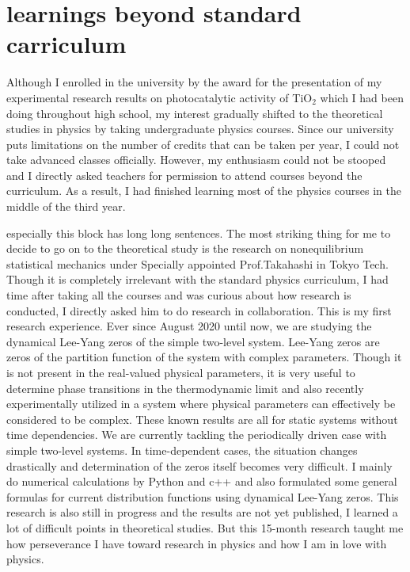 \documentclass[a4]{article}
\begin{document}
\section{learnings beyond standard carriculum}
Although I enrolled in the university by the award for the presentation of my experimental research results on photocatalytic activity of TiO$_2$ which I had been doing throughout high school, my interest gradually shifted to the theoretical studies in physics by taking undergraduate physics courses. Since our university puts limitations on the number of credits that can be taken per year, I could not take advanced classes officially. However, my enthusiasm could not be stooped and I directly asked teachers for permission to attend courses beyond the curriculum. As a result, I had finished learning most of the physics courses in the middle of the third year.\par

especially this block has long long sentences.
The most striking thing for me to decide to go on to the theoretical study is the research on nonequilibrium statistical mechanics under Specially appointed Prof.Takahashi in Tokyo Tech. Though it is completely irrelevant with the standard physics curriculum, I had time after taking all the courses and was curious about how research is conducted, I directly asked him to do research in collaboration. This is my first research experience. Ever since August 2020 until now, we are studying the dynamical Lee-Yang zeros of the simple two-level system. Lee-Yang zeros are zeros of the partition function of the system with complex parameters. Though it is not present in the real-valued physical parameters, it is very useful to determine phase transitions in the thermodynamic limit and also recently experimentally utilized in a system where physical parameters can effectively be considered to be complex. These known results are all for static systems without time dependencies. We are currently tackling the periodically driven case with simple two-level systems. In time-dependent cases, the situation changes drastically and determination of the zeros itself becomes very difficult. I mainly do numerical calculations by Python and c++ and also formulated some general formulas for current distribution functions using dynamical Lee-Yang zeros. This research is also still in progress and the results are not yet published, I learned a lot of difficult points in theoretical studies. But this 15-month research taught me how perseverance I have toward research in physics and how I am in love with physics.\par
\end{document}
